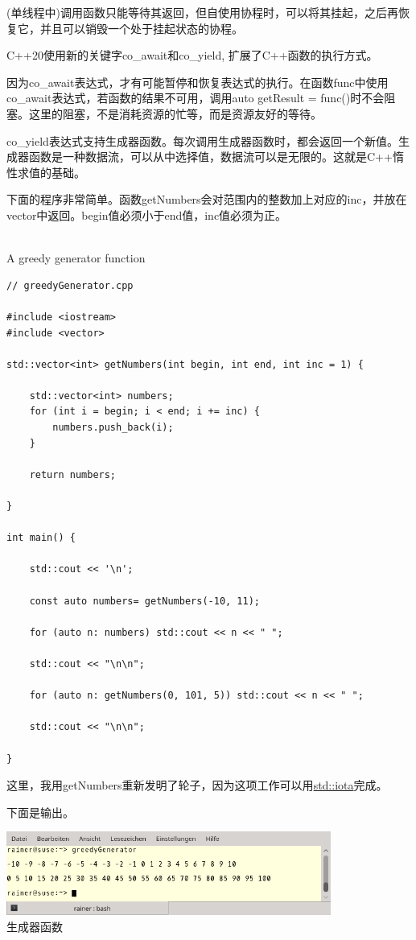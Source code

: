 (单线程中)调用函数只能等待其返回，但自使用协程时，可以将其挂起，之后再恢复它，并且可以销毁一个处于挂起状态的协程。

C++20使用新的关键字co\_await和co\_yield, 扩展了C++函数的执行方式。

因为co\_await表达式，才有可能暂停和恢复表达式的执行。在函数func中使用co\_await表达式，若函数的结果不可用，调用auto getResult = func()时不会阻塞。这里的阻塞，不是消耗资源的忙等，而是资源友好的等待。

co\_yield表达式支持生成器函数。每次调用生成器函数时，都会返回一个新值。生成器函数是一种数据流，可以从中选择值，数据流可以是无限的。这就是C++惰性求值的基础。


下面的程序非常简单。函数getNumbers会对范围内的整数加上对应的inc，并放在vector中返回。begin值必须小于end值，inc值必须为正。

\hspace*{\fill} \\ %
\noindent
A greedy generator function
\begin{lstlisting}[style=styleCXX]
// greedyGenerator.cpp

#include <iostream>
#include <vector>

std::vector<int> getNumbers(int begin, int end, int inc = 1) {

	std::vector<int> numbers;
	for (int i = begin; i < end; i += inc) {
		numbers.push_back(i);
	}
	
	return numbers;

}

int main() {

	std::cout << '\n';
	
	const auto numbers= getNumbers(-10, 11);
	
	for (auto n: numbers) std::cout << n << " ";
	
	std::cout << "\n\n";
	
	for (auto n: getNumbers(0, 101, 5)) std::cout << n << " ";
	
	std::cout << "\n\n";

}
\end{lstlisting}

这里，我用getNumbers重新发明了轮子，因为这项工作可以用\href{http://en.cppreference.com/w/cpp/algorithm/iota}{std::iota}完成。

下面是输出。

\begin{center}
\includegraphics[width=0.8\textwidth]{content/3/chapter6/images/4.png}\\
生成器函数
\end{center}

